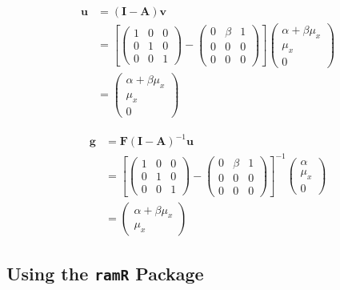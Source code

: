 \documentclass[
]{book}
\theoremstyle{definition}
\theoremstyle{definition}
\theoremstyle{definition}
\theoremstyle{remark}
\begin{document}
\begin{align*}\mathbf{u} &=\left( \mathbf{I} - \mathbf{A} \right) \mathbf{v}\\ &=\left[\left( \begin{array}{ccc} 1 & 0 & 0 \\ 0 & 1 & 0 \\ 0 & 0 & 1 \end{array} \right)-\left( \begin{array}{ccc} 0 & \beta  & 1 \\ 0 & 0 & 0 \\ 0 & 0 & 0 \end{array} \right)\right]\left( \begin{array}{c} \alpha  + \beta  \mu  _{x} \\ \mu  _{x} \\ 0 \end{array} \right)\\ &=\left( \begin{array}{c} \alpha  + \beta  \mu  _{x} \\ \mu  _{x} \\ 0 \end{array} \right)\end{align*}

\begin{align*}\mathbf{g} &=\mathbf{F} \left( \mathbf{I} - \mathbf{A} \right)^{-1} \mathbf{u}\\ &=\left[\left( \begin{array}{ccc} 1 & 0 & 0 \\ 0 & 1 & 0 \\ 0 & 0 & 1 \end{array} \right)-\left( \begin{array}{ccc} 0 & \beta  & 1 \\ 0 & 0 & 0 \\ 0 & 0 & 0 \end{array} \right)\right]^{-1}\left( \begin{array}{c} \alpha  \\ \mu  _{x} \\ 0 \end{array} \right)\\ &=\left( \begin{array}{c} \alpha  + \beta  \mu  _{x} \\ \mu  _{x} \end{array} \right)\end{align*}

\hypertarget{using-the-ramr-package}{%
\subsection{\texorpdfstring{Using the \texttt{ramR} Package}{Using the ramR Package}}\label{using-the-ramr-package}}
\end{document}
